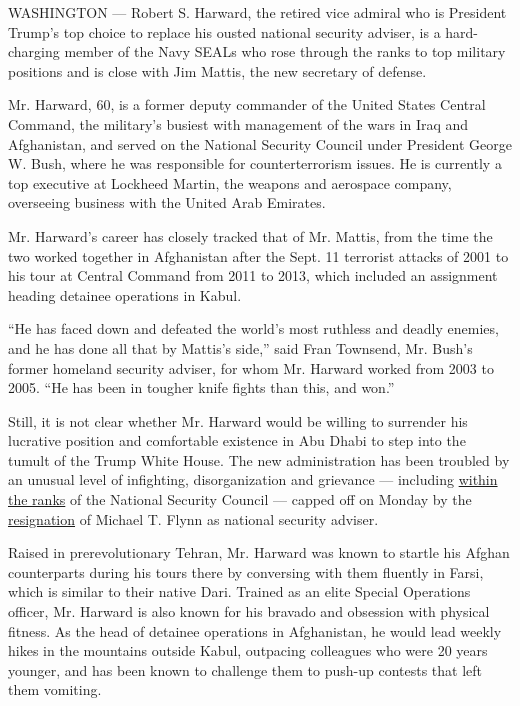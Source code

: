 WASHINGTON --- Robert S. Harward, the retired vice admiral who is
President Trump's top choice to replace his ousted national security
adviser, is a hard-charging member of the Navy SEALs who rose through
the ranks to top military positions and is close with Jim Mattis, the
new secretary of defense.

Mr. Harward, 60, is a former deputy commander of the United States
Central Command, the military's busiest with management of the wars in
Iraq and Afghanistan, and served on the National Security Council under
President George W. Bush, where he was responsible for counterterrorism
issues. He is currently a top executive at Lockheed Martin, the weapons
and aerospace company, overseeing business with the United Arab
Emirates.

Mr. Harward's career has closely tracked that of Mr. Mattis, from the
time the two worked together in Afghanistan after the Sept. 11 terrorist
attacks of 2001 to his tour at Central Command from 2011 to 2013, which
included an assignment heading detainee operations in Kabul.

``He has faced down and defeated the world's most ruthless and deadly
enemies, and he has done all that by Mattis's side,'' said Fran
Townsend, Mr. Bush's former homeland security adviser, for whom Mr.
Harward worked from 2003 to 2005. ``He has been in tougher knife fights
than this, and won.''

Still, it is not clear whether Mr. Harward would be willing to surrender
his lucrative position and comfortable existence in Abu Dhabi to step
into the tumult of the Trump White House. The new administration has
been troubled by an unusual level of infighting, disorganization and
grievance --- including
\href{http://www.nytimes.com/2017/02/12/us/politics/national-security-council-turmoil.html}{within
the ranks} of the National Security Council --- capped off on Monday by
the
\href{https://www.nytimes.com/2017/02/13/us/politics/donald-trump-national-security-adviser-michael-flynn.html?hp\&action=click\&pgtype=Homepage\&clickSource=story-heading\&module=a-lede-package-region\&region=top-news\&WT.nav=top-news\&_r=0}{resignation}
of Michael T. Flynn as national security adviser.

Raised in prerevolutionary Tehran, Mr. Harward was known to startle his
Afghan counterparts during his tours there by conversing with them
fluently in Farsi, which is similar to their native Dari. Trained as an
elite Special Operations officer, Mr. Harward is also known for his
bravado and obsession with physical fitness. As the head of detainee
operations in Afghanistan, he would lead weekly hikes in the mountains
outside Kabul, outpacing colleagues who were 20 years younger, and has
been known to challenge them to push-up contests that left them
vomiting.

